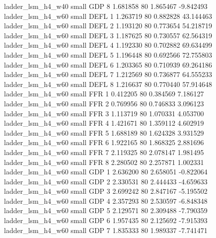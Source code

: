        ladder_lsm_h4_w40      small      GDP                 8 1.681858 80       1.865467          -9.842493
       ladder_lsm_h4_w60      small     DEFL                 1 1.263719 80       0.882828          43.144463
       ladder_lsm_h4_w60      small     DEFL                 2 1.193120 80       0.773654          54.218719
       ladder_lsm_h4_w60      small     DEFL                 3 1.187625 80       0.730557          62.564319
       ladder_lsm_h4_w60      small     DEFL                 4 1.192330 80       0.702882          69.634499
       ladder_lsm_h4_w60      small     DEFL                 5 1.196448 80       0.692566          72.755803
       ladder_lsm_h4_w60      small     DEFL                 6 1.203365 80       0.710939          69.264186
       ladder_lsm_h4_w60      small     DEFL                 7 1.212569 80       0.736877          64.555233
       ladder_lsm_h4_w60      small     DEFL                 8 1.216637 80       0.770440          57.914648
       ladder_lsm_h4_w60      small      FFR                 1 0.412205 80       0.384569           7.186127
       ladder_lsm_h4_w60      small      FFR                 2 0.769956 80       0.746833           3.096123
       ladder_lsm_h4_w60      small      FFR                 3 1.113719 80       1.070331           4.053700
       ladder_lsm_h4_w60      small      FFR                 4 1.421671 80       1.359112           4.602919
       ladder_lsm_h4_w60      small      FFR                 5 1.688189 80       1.624328           3.931529
       ladder_lsm_h4_w60      small      FFR                 6 1.922165 80       1.868325           2.881696
       ladder_lsm_h4_w60      small      FFR                 7 2.119325 80       2.078147           1.981495
       ladder_lsm_h4_w60      small      FFR                 8 2.280502 80       2.257871           1.002331
       ladder_lsm_h4_w60      small      GDP                 1 2.636200 80       2.658051          -0.822064
       ladder_lsm_h4_w60      small      GDP                 2 2.330531 80       2.444433          -4.659633
       ladder_lsm_h4_w60      small      GDP                 3 2.699242 80       2.847167          -5.195502
       ladder_lsm_h4_w60      small      GDP                 4 2.357293 80       2.530597          -6.848348
       ladder_lsm_h4_w60      small      GDP                 5 2.129571 80       2.309488          -7.790359
       ladder_lsm_h4_w60      small      GDP                 6 1.957435 80       2.125692          -7.915393
       ladder_lsm_h4_w60      small      GDP                 7 1.835333 80       1.989337          -7.741471
